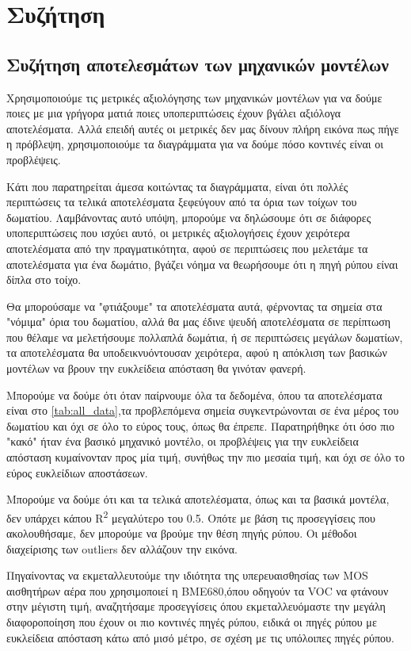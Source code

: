\section{Συζήτηση}

\subsection{Συζήτηση αποτελεσμάτων των μηχανικών μοντέλων}
Χρησιμοποιούμε τις μετρικές αξιολόγησης των μηχανικών μοντέλων για να δούμε ποιες με μια γρήγορα ματιά ποιες υποπεριπτώσεις έχουν βγάλει αξιόλογα αποτελέσματα.
Αλλά επειδή αυτές οι μετρικές δεν μας δίνουν πλήρη εικόνα πως πήγε η πρόβλεψη, χρησιμοποιούμε τα διαγράμματα για να δούμε πόσο κοντινές είναι οι προβλέψεις.

Κάτι που παρατηρείται άμεσα κοιτώντας τα διαγράμματα, είναι ότι πολλές περιπτώσεις τα τελικά αποτελέσματα ξεφεύγουν από τα όρια των τοίχων του δωματίου.
Λαμβάνοντας αυτό υπόψη, μπορούμε να δηλώσουμε ότι σε διάφορες υποπεριπτώσεις που ισχύει αυτό, οι μετρικές αξιολογήσεις έχουν χειρότερα αποτελέσματα από την πραγματικότητα,
αφού σε περιπτώσεις που μελετάμε τα αποτελέσματα για ένα δωμάτιο, βγάζει νόημα να θεωρήσουμε ότι η πηγή ρύπου είναι δίπλα στο τοίχο.

Θα μπορούσαμε να "φτιάξουμε" τα αποτελέσματα αυτά, φέρνοντας τα σημεία στα "νόμιμα" όρια του δωματίου, αλλά θα μας έδινε ψευδή αποτελέσματα σε περίπτωση που θέλαμε να μελετήσουμε πολλαπλά δωμάτια,
ή σε περιπτώσεις μεγάλων δωματίων, τα αποτελέσματα θα υποδεικνυόντουσαν χειρότερα, αφού η απόκλιση των βασικών μοντέλων να βρουν την ευκλείδεια απόσταση θα γινόταν φανερή.
 
Μπορούμε να δούμε ότι όταν παίρνουμε όλα τα δεδομένα, όπου τα αποτελέσματα είναι στο \autoref{tab:all_data},τα προβλεπόμενα σημεία συγκεντρώνονται σε ένα μέρος του δωματίου και όχι σε όλο το εύρος τους, όπως θα έπρεπε.
Παρατηρήθηκε ότι όσο πιο "κακό" ήταν ένα βασικό μηχανικό μοντέλο, οι προβλέψεις για την ευκλείδεια απόσταση κυμαίνονταν προς μία τιμή, συνήθως την πιο μεσαία τιμή, και όχι σε όλο το εύρος ευκλείδιων αποστάσεων.

Μπορούμε να δούμε ότι και τα τελικά αποτελέσματα, όπως και τα βασικά μοντέλα, δεν υπάρχει κάπου R\textsuperscript{2} μεγαλύτερο του 0.5.
Οπότε με βάση τις προσεγγίσεις που ακολουθήσαμε, δεν μπορούμε να βρούμε την θέση πηγής ρύπου. Οι μέθοδοι διαχείρισης των outliers δεν αλλάζουν την εικόνα.

Πηγαίνοντας να εκμεταλλευτούμε την ιδιότητα της υπερευαισθησίας των MOS αισθητήρων αέρα που χρησιμοποιεί η BME680,όπου οδηγούν τα VOC να φτάνουν στην μέγιστη τιμή,
αναζητήσαμε προσεγγίσεις όπου εκμεταλλευόμαστε την μεγάλη διαφοροποίηση που έχουν οι πιο κοντινές πηγές ρύπου,
ειδικά οι πηγές ρύπου με ευκλείδεια απόσταση κάτω από μισό μέτρο, σε σχέση με τις υπόλοιπες πηγές ρύπου.


